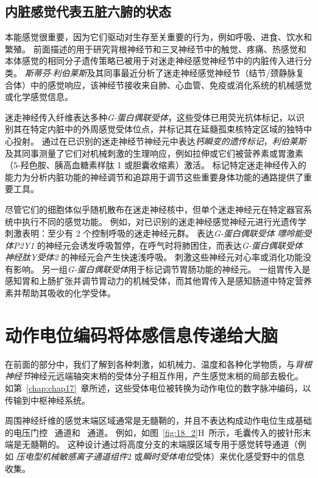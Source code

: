 \subsection{内脏感觉代表五脏六腑的状态}

本能感觉很重要，因为它们驱动对生存至关重要的行为，例如呼吸、进食、饮水和繁殖。
前面描述的用于研究背根神经节和三叉神经节中的触觉、疼痛、热感觉和本体感觉的相同分子遗传策略已被用于对迷走神经感觉神经节中的内脏传入进行分类。
\textit{斯蒂芬$\cdot$利伯莱斯}及其同事最近分析了迷走神经感觉神经节（结节/颈静脉复合体）中的感觉响应，该神经节接收来自肺、心血管、免疫或消化系统的机械感觉或化学感觉信息。


迷走神经传入纤维表达多种\textit{G-蛋白偶联受体}，这些受体已用荧光抗体标记，以识别其在特定内脏中的外周感觉受体位点，并标记其在延髓孤束核特定区域的独特中心投射。
通过在已识别的迷走神经节神经元中表达\textit{钙瞬变的遗传标记}，\textit{利伯莱斯}及其同事测量了它们对机械刺激的生理响应，例如拉伸或它们被营养素或胃激素（5-羟色胺、胰高血糖素样肽 1 或胆囊收缩素）激活。
标记特定迷走神经传入的能力为分析内脏功能的神经调节和追踪用于调节这些重要身体功能的通路提供了重要工具。


尽管它们的细胞体似乎随机散布在迷走神经核中，但单个迷走神经元在特定器官系统中执行不同的感觉功能。
例如，对已识别的迷走神经感觉神经元进行光遗传学刺激表明：至少有 2 个控制呼吸的迷走神经元群。
表达\textit{G-蛋白偶联受体} \textit{嘌呤能受体P2Y1} 的神经元会诱发呼吸暂停，在呼气时将肺困住，而表达\textit{G-蛋白偶联受体} \textit{神经肽Y受体2} 的神经元会产生快速浅呼吸。
刺激这些神经元对心率或消化功能没有影响。
另一组\textit{G-蛋白偶联受体}用于标记调节胃肠功能的神经元。
一组胃传入是感知胃和上肠扩张并调节胃动力的机械受体，而其他胃传入是感知肠道中特定营养素并帮助其吸收的化学受体。



\section{动作电位编码将体感信息传递给大脑}

在前面的部分中，我们了解到各种刺激，如机械力、温度和各种化学物质，与\textit{背根神经节}神经元远端轴突末梢的受体分子相互作用，产生感觉末梢的局部去极化。
如第~\ref{chap:chap17}~章所述，这些受体电位被转换为动作电位的数字脉冲编码，以传输到中枢神经系统。


周围神经纤维的感觉末端区域通常是无髓鞘的，并且不表达构成动作电位生成基础的电压门控~ 通道和~ 通道。
例如，如图~\ref{fig:18_2}H~所示，毛囊传入的披针形末端是无髓鞘的。
这种设计通过将高度分支的末端膜区域专用于感觉转导通道（例如 \textit{压电型机械敏感离子通道组件}2 或\textit{瞬时受体电位}受体）来优化感受野中的信息收集。


